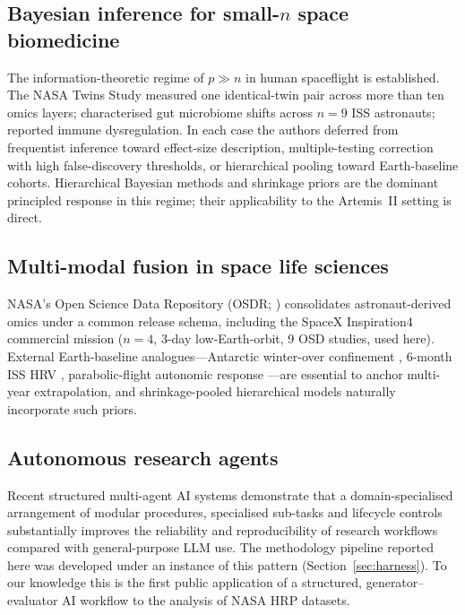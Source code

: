 \documentclass[11pt,a4paper,3p,authoryear]{elsarticle}
\begin{document}
\subsection{Bayesian inference for small-$n$ space biomedicine}
The information-theoretic regime of $p \gg n$ in human spaceflight is established. The NASA Twins Study \citep{GarrettBakelman2019twins} measured one identical-twin pair across more than ten omics layers; \citet{Voorhies2019iss} characterised gut microbiome shifts across $n=9$ ISS astronauts; \citet{Crucian2018cortisol} reported immune dysregulation. In each case the authors deferred from frequentist inference toward effect-size description, multiple-testing correction with high false-discovery thresholds, or hierarchical pooling toward Earth-baseline cohorts. Hierarchical Bayesian methods \citep{Gelman2006priors} and shrinkage priors \citep{Carvalho2010horseshoe,Piironen2017regularised} are the dominant principled response in this regime; their applicability to the Artemis~II setting is direct.

\subsection{Multi-modal fusion in space life sciences}
NASA's Open Science Data Repository (OSDR; \citealt{OSDR2024}) consolidates astronaut-derived omics under a common release schema, including the SpaceX Inspiration4 commercial mission \citep{Sanders2024i4} ($n=4$, 3-day low-Earth-orbit, 9 OSD studies, used here). External Earth-baseline analogues---Antarctic winter-over confinement \citep{Kuipers2020antarctic}, 6-month ISS HRV \citep{Edgell2019iss}, parabolic-flight autonomic response \citep{Schlegel1998parabolic}---are essential to anchor multi-year extrapolation, and shrinkage-pooled hierarchical models naturally incorporate such priors.

\subsection{Autonomous research agents}
Recent structured multi-agent AI systems \citep{Zhou2026nora,Lu2026ai,Cheng2026mind2report} demonstrate that a domain-specialised arrangement of modular procedures, specialised sub-tasks and lifecycle controls substantially improves the reliability and reproducibility of research workflows compared with general-purpose LLM use. The methodology pipeline reported here was developed under an instance of this pattern (Section~\ref{sec:harness}). To our knowledge this is the first public application of a structured, generator--evaluator AI workflow to the analysis of NASA HRP datasets.
\end{document}
